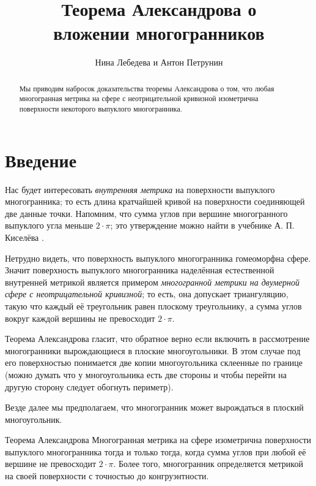 \documentclass[oneside,a4paper]{article}
\begin{document}
\title{Теорема Александрова о\\ вложении многогранников}
\author{Нина Лебедева и Антон Петрунин}
\date{}
\maketitle

\begin{abstract}
Мы приводим набросок доказательства теоремы Александрова о том, что любая многогранная метрика на сфере с неотрицательной кривизной изометрична поверхности некоторого выпуклого многогранника.
\end{abstract}

\section{Введение}

Нас будет интересовать \emph{внутренняя метрика} на поверхности выпуклого многогранника;
то есть длина кратчайшей кривой на поверхности соединяющей две данные точки.
Напомним, что сумма углов при вершине многогранного выпуклого угла меньше $2\cdot \pi$; это утверждение можно найти в учебнике А. П. Киселёва \cite[§~325]{kiselyov}.

Нетрудно видеть, что поверхность выпуклого многогранника гомеоморфна сфере.
Значит поверхность выпуклого многогранника наделённая естественной внутренней метрикой
является примером \emph{многогранной метрики на двумерной сфере с неотрицательной кривизной}; то есть,
она допускает триангуляцию, 
такую что каждый её треугольник равен плоскому треугольнику, а сумма углов вокруг каждой вершины не превосходит $2\cdot\pi$.

Теорема Александрова гласит, что обратное верно если включить в рассмотрение многогранники вырождающиеся в плоские многоугольники.
В этом случае под его поверхностью понимается две копии многоугольника склеенные по границе
(можно думать что у многоугольника есть две стороны и чтобы перейти на другую сторону следует обогнуть периметр).

Везде далее мы предполагаем, что многогранник может вырождаться в плоский многоугольник.


\begin{thm}{Теорема Александрова}
Многогранная метрика на сфере изометрична поверхности выпуклого многогранника тогда и только тогда, когда сумма углов при любой её вершине не превосходит $2\cdot\pi$.
Более того, многогранник определяется метрикой на своей поверхности с точностью до конгруэнтности.
\end{thm}
\end{document}
